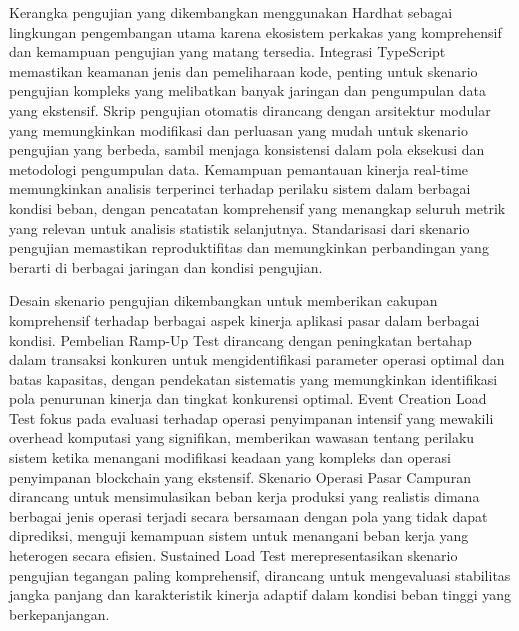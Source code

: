 Kerangka pengujian yang dikembangkan menggunakan Hardhat sebagai lingkungan
pengembangan utama karena ekosistem perkakas yang komprehensif dan kemampuan
pengujian yang matang tersedia. Integrasi TypeScript memastikan keamanan jenis
dan pemeliharaan kode, penting untuk skenario pengujian kompleks yang
melibatkan banyak jaringan dan pengumpulan data yang ekstensif. Skrip pengujian
otomatis dirancang dengan arsitektur modular yang memungkinkan modifikasi dan
perluasan yang mudah untuk skenario pengujian yang berbeda, sambil menjaga
konsistensi dalam pola eksekusi dan metodologi pengumpulan data. Kemampuan
pemantauan kinerja real-time memungkinkan analisis terperinci terhadap perilaku
sistem dalam berbagai kondisi beban, dengan pencatatan komprehensif yang
menangkap seluruh metrik yang relevan untuk analisis statistik selanjutnya.
Standarisasi dari skenario pengujian memastikan reproduktifitas dan
memungkinkan perbandingan yang berarti di berbagai jaringan dan kondisi
pengujian.

Desain skenario pengujian dikembangkan untuk memberikan cakupan komprehensif
terhadap berbagai aspek kinerja aplikasi pasar dalam berbagai kondisi.
Pembelian Ramp-Up Test dirancang dengan peningkatan bertahap dalam transaksi
konkuren untuk mengidentifikasi parameter operasi optimal dan batas kapasitas,
dengan pendekatan sistematis yang memungkinkan identifikasi pola penurunan
kinerja dan tingkat konkurensi optimal. Event Creation Load Test fokus pada
evaluasi terhadap operasi penyimpanan intensif yang mewakili overhead komputasi
yang signifikan, memberikan wawasan tentang perilaku sistem ketika menangani
modifikasi keadaan yang kompleks dan operasi penyimpanan blockchain yang
ekstensif. Skenario Operasi Pasar Campuran dirancang untuk mensimulasikan beban
kerja produksi yang realistis dimana berbagai jenis operasi terjadi secara
bersamaan dengan pola yang tidak dapat diprediksi, menguji kemampuan sistem
untuk menangani beban kerja yang heterogen secara efisien. Sustained Load Test
merepresentasikan skenario pengujian tegangan paling komprehensif, dirancang
untuk mengevaluasi stabilitas jangka panjang dan karakteristik kinerja adaptif
dalam kondisi beban tinggi yang berkepanjangan.

